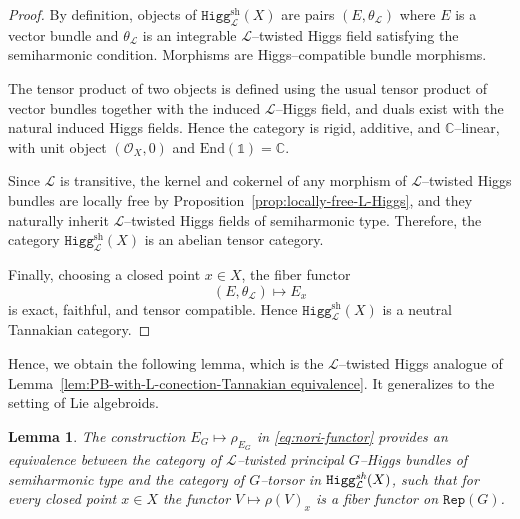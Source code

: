 \documentclass[12pt,reqno]{amsart}
\numberwithin{equation}{subsection}
\newtheorem{lem}[equation]{Lemma}
\theoremstyle{definition}
\theoremstyle{theorem}
\begin{document}
\begin{proof}
	By definition, objects of $\texttt{Higg}^{\text{sh}}_{\mathcal L}(X)$ are
	pairs $(E,\theta_{\mathcal L})$ where $E$ is a vector bundle and
	$\theta_{\mathcal L}$ is an integrable $\mathcal L$--twisted Higgs field
	satisfying the semiharmonic condition. Morphisms are Higgs--compatible
	bundle morphisms.
	
	The tensor product of two objects is defined using the usual tensor
	product of vector bundles together with the induced $\mathcal L$--Higgs
	field, and duals exist with the natural induced Higgs fields. Hence the
	category is rigid, additive, and $\mathbb C$--linear, with unit object
	$(\mathcal O_X,0)$ and $\mathrm{End}(\mathbb 1)=\mathbb C$.
	
	Since $\mathcal L$ is transitive, the kernel and cokernel of any morphism of
	$\mathcal L$--twisted Higgs bundles are locally free by
	Proposition~\eqref{prop:locally-free-L-Higgs}, and they naturally inherit
	$\mathcal L$--twisted Higgs fields of semiharmonic type.  
	Therefore, the category $\texttt{Higg}^{\text{sh}}_{\mathcal L}(X)$ is an abelian tensor category.
	
	Finally, choosing a closed point $x\in X$, the fiber functor
	\[
	(E,\theta_{\mathcal L}) \longmapsto E_x
	\]
	is exact, faithful, and tensor compatible. Hence
	$\texttt{Higg}^{\text{sh}}_{\mathcal L}(X)$ is a neutral Tannakian
	category.
\end{proof}
Hence, we obtain the following lemma, which is the $\mathcal{L}$--twisted
Higgs analogue of Lemma~\eqref{lem:PB-with-L-conection-Tannakian equivalence}.
It generalizes \cite[\S\,9, Lemma~9.2]{CT.Simpson-1995} to the setting of
Lie algebroids.

\begin{lem}\label{lem: L-twisted PB-Higgs bundle-tannakian}
	The construction $E_{G}\mapsto \rho_{E_{G}}$ in
	\eqref{eq:nori-functor} provides an equivalence between the category of $\mathcal{L}$--twisted principal $G$--Higgs bundles of semiharmonic type and the category of $G$--torsor in $\texttt{Higg}^{\emph{sh}}_{\mathcal L}(X)$,
	such that for every closed point $x\in X$ the functor
	$V\mapsto \rho(V)_x$ is a fiber functor on $\texttt{Rep}(G)$.
\end{lem}
\end{document}
